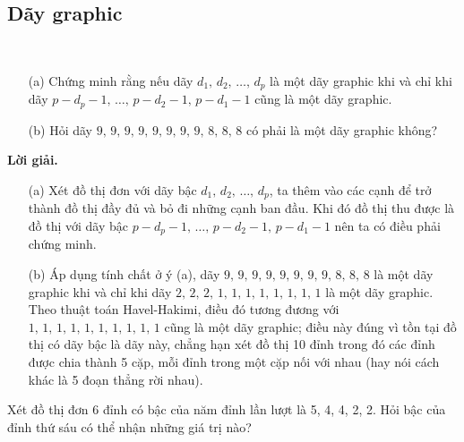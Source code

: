 \subsection{Dãy graphic}

\begin{tcolorbox}[breakable]
    \begin{baitoan}\label{pb:w02:08}
        ~
        
        \begin{enumerate}
            \item[(a)] Chứng minh rằng nếu dãy $d_1,\,d_2,\,\ldots,\,d_p$ là một dãy graphic khi và chỉ khi dãy $p - d_p - 1,\,\ldots,\,p-d_2-1,\,p-d_1-1$ cũng là một dãy graphic.
            \item[(b)] Hỏi dãy $9,\,9,\,9,\,9,\,9,\,9,\,9,\,9,\,8,\,8,\,8$ có phải là một dãy graphic không? 
        \end{enumerate}
    \end{baitoan}
\end{tcolorbox}

\textbf{Lời giải. }

\begin{enumerate}
    \item[(a)] Xét đồ thị đơn với dãy bậc $d_1,\,d_2,\,\ldots,\,d_p$, ta thêm vào các cạnh để trở thành đồ thị đầy đủ và bỏ đi những cạnh ban đầu. Khi đó đồ thị thu được là đồ thị với dãy bậc $p - d_p - 1,\,\ldots,\,p-d_2-1,\,p-d_1-1$ nên ta có điều phải chứng minh.
    \item[(b)] Áp dụng tính chất ở ý (a), dãy $9,\,9,\,9,\,9,\,9,\,9,\,9,\,9,\,8,\,8,\,8$ là một dãy graphic khi và chỉ khi dãy $2,\,2,\,2,\,1,\,1,\,1,\,1,\,1,\,1,\,1,\,1$ là một dãy graphic. Theo thuật toán Havel-Hakimi, điều đó tương đương với $1,\,1,\,1,\,1,\,1,\,1,\,1,\,1,\,1,\,1$ cũng là một dãy graphic; điều này đúng vì tồn tại đồ thị có dãy bậc là dãy này, chẳng hạn xét đồ thị 10 đỉnh trong đó các đỉnh được chia thành 5 cặp, mỗi đỉnh trong một cặp nối với nhau (hay nói cách khác là 5 đoạn thẳng rời nhau).
\end{enumerate}

\begin{tcolorbox}[breakable]
    \begin{baitoan}\label{pb:w02:07}
        Xét đồ thị đơn 6 đỉnh có bậc của năm đỉnh lần lượt là 5, 4, 4, 2, 2. Hỏi bậc của đỉnh thứ sáu có thể nhận những giá trị nào?
    \end{baitoan}
\end{tcolorbox}

